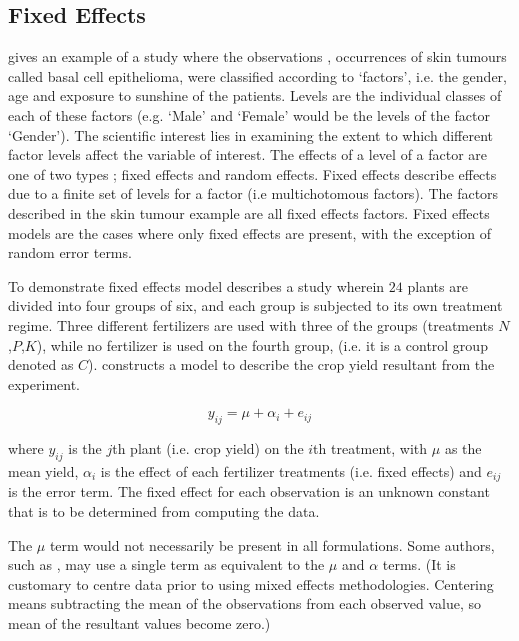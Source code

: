 \documentclass[12pt, a4paper]{report}
\begin{document}
\subsection{Fixed Effects}
\citet{McCullSearle} gives an example of a study where the
observations , occurrences of skin tumours called basal cell
epithelioma, were classified according to `factors', i.e. the
gender, age and exposure to sunshine of the patients. Levels are
the individual classes of each of these factors (e.g. `Male' and
`Female' would be the levels of the factor `Gender'). The
scientific interest lies in examining the extent to which
different factor levels affect the variable of interest. The
effects of a level of a factor are one of two types ; fixed
effects and random effects. Fixed effects describe effects due to
a finite set of levels for a factor (i.e multichotomous factors).
The factors described in the skin tumour example are all fixed
effects factors. Fixed effects models are the cases where only
fixed effects are present, with the exception of random error
terms.

To demonstrate fixed effects model \citet{Searle} describes a
study wherein $24$ plants are divided into four groups of six, and
each group is subjected to its own treatment regime. Three
different fertilizers are used with three of the groups
(treatments $N$,$P$,$K$), while no fertilizer is used on the
fourth group, (i.e. it is a control group denoted as $C$).
\citet{Searle} constructs a model to describe the crop yield
resultant from the experiment.

\begin{equation}
y_{ij} = \mu + \alpha_{i} + e_{ij}
\end{equation}

where $y_{ij}$ is the $j$th plant (i.e. crop yield) on the $i$th
treatment, with $\mu$ as the mean yield, $\alpha_{i}$ is the
effect of each fertilizer treatments (i.e. fixed effects) and
$e_{ij}$ is the error term. The fixed effect for each observation
is an unknown constant that is to be determined from computing the
data.

 The $\mu$ term would not
necessarily be present in all formulations. Some authors, such as
\citet{Demi}, may use a single term as equivalent to the $\mu$ and
$\alpha$ terms. (It is customary to centre data prior to using
mixed effects methodologies. Centering means subtracting the mean
of the observations from each observed value, so mean of the
resultant values become zero.)
\end{document}
